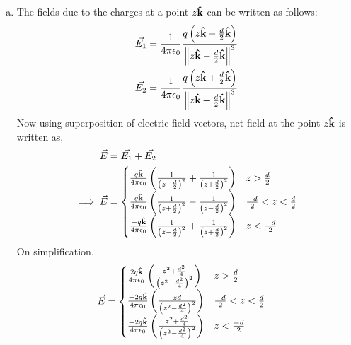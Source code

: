 \begin{problem}{}{}

\begin{enumerate}[(a)]
    \item The fields due to the charges at a point $z \boldsymbol{\hat{\textbf{k}}}$ can be written as follows:
    \begin{align*}
        \vec{E_1} = \frac{1}{4\pi\epsilon_0} \frac{q\left(z\boldsymbol{\hat{\textbf{k}}} - \frac{d}{2}\boldsymbol{\hat{\textbf{k}}}\right)}{\left \Vert z\boldsymbol{\hat{\textbf{k}}} - \frac{d}{2} \boldsymbol{\hat{\textbf{k}}} \right \Vert^3} \\
         \vec{E_2} = \frac{1}{4\pi\epsilon_0} \frac{q\left(z\boldsymbol{\hat{\textbf{k}}} + \frac{d}{2}\boldsymbol{\hat{\textbf{k}}}\right)}{\left \Vert z\boldsymbol{\hat{\textbf{k}}} + \frac{d}{2} \boldsymbol{\hat{\textbf{k}}} \right \Vert^3} 
    \end{align*}
    Now using superposition of electric field vectors, net field at the point $z\boldsymbol{\hat{\textbf{k}}}$ is written as,
    \begin{align*}
        \vec{E} &= \vec{E_1} + \vec{E_2}\\
        \implies \vec{E} &= 
        \begin{cases}
            \frac{q\boldsymbol{\hat{\textbf{k}}}}{4\pi\epsilon_0} \left(\frac{1}{\left(z-\frac{d}{2}\right)^2} + \frac{1}{\left(z+\frac{d}{2}\right)^2}\right) & z >\frac{d}{2}\\
             \frac{q\boldsymbol{\hat{\textbf{k}}}}{4\pi\epsilon_0} \left(\frac{1}{\left(z+\frac{d}{2}\right)^2} - \frac{1}{\left(z-\frac{d}{2}\right)^2}\right) & \frac{-d}{2}<z<\frac{d}{2}\\
            \frac{-q\boldsymbol{\hat{\textbf{k}}}}{4\pi\epsilon_0} \left(\frac{1}{\left(z-\frac{d}{2}\right)^2} + \frac{1}{\left(z+\frac{d}{2}\right)^2}\right) & z <\frac{-d}{2}
        \end{cases}
    \end{align*}
    On simplification,
    \begin{align*}
        \vec{E} &= 
        \begin{cases}
            \frac{2q\boldsymbol{\hat{\textbf{k}}}}{4\pi\epsilon_0} \left(\frac{z^2 + \frac{d^2}{4}}{\left(z^2 - \frac{d^2}{4}\right)^2}\right) & z >\frac{d}{2}\\
             \frac{-2q\boldsymbol{\hat{\textbf{k}}}}{4\pi\epsilon_0} \left(\frac{zd}{\left(z^2 - \frac{d^2}{4}\right)^2}\right) & \frac{-d}{2}<z<\frac{d}{2}\\
            \frac{-2q\boldsymbol{\hat{\textbf{k}}}}{4\pi\epsilon_0} \left(\frac{z^2 + \frac{d^2}{4}}{\left(z^2 - \frac{d^2}{4}\right)^2}\right) & z <\frac{-d}{2}
        \end{cases}
    \end{align*}


\end{enumerate}
\end{problem}
